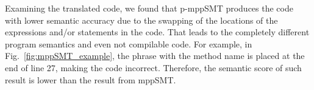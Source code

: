 %

Examining the translated code, we found that p-mppSMT produces the
code with lower semantic accuracy due to the swapping of the locations
of the expressions and/or statements in the code. That leads to the
completely different program semantics and even not compilable code. For
example, in Fig.~\ref{fig:mppSMT_example}, the phrase with the method
name  is placed at the end of line 27, making the code
incorrect. Therefore, the semantic score of such result is lower
than the result from mppSMT.

%




